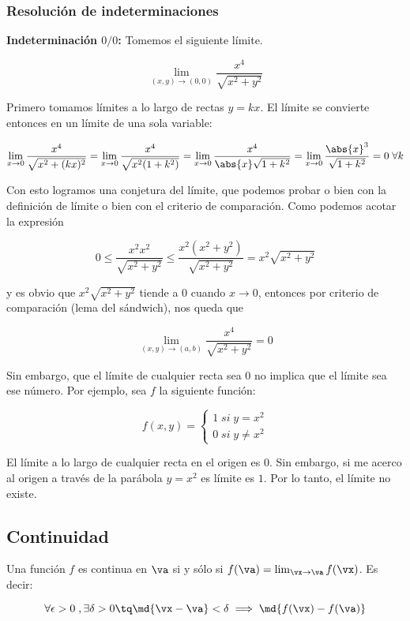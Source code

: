 \documentclass[12pt,a4paper,titlepage]{apuntes}
\begin{document}
\subsubsection{Resolución de indeterminaciones}

\textbf{Indeterminación $0/0$:} Tomemos el siguiente límite.

\[ \lim_{(x,y)\to(0,0)} \frac{x^4}{\sqrt{x^2+y^2}} \]

Primero tomamos límites a lo largo de rectas $y=kx$. El límite se convierte entonces en un límite de una sola variable:

\[\lim_{x\to 0} \frac{x^4}{\sqrt{x^2+(kx)^2}} = \lim_{x\to 0} \frac{x^4}{\sqrt{x^2(1+k^2)}} = \lim_{x\to 0} \frac{x^4}{\abs{x}\sqrt{1+k^2}} = \lim_{x\to 0} \frac{\abs{x}^3}{\sqrt{1+k^2}} = 0\; \forall k\]

Con esto logramos una conjetura del límite, que podemos probar o bien con la definición de límite o bien con el criterio de comparación. Como podemos acotar la expresión

\[ 0 \leq \frac{x^2x^2}{\sqrt{x^2+y^2}} \leq \frac{x^2(x^2+y^2)}{\sqrt{x^2+y^2}} = x^2\sqrt{x^2+y^2} \]

y es obvio que $x^2\sqrt{x^2+y^2}$ tiende a $0$ cuando $x\to 0$, entonces por criterio de comparación (lema del sándwich), nos queda que

\[\lim_{(x,y)\to(a,b)}\frac{x^4}{\sqrt{x^2+y^2}} = 0 \]

Sin embargo, que el límite de cualquier recta sea 0 no implica que el límite sea ese número. Por ejemplo, sea $f$ la siguiente función:

\[ f (x,y) = \left\lbrace \begin{matrix} 1\; si\; y=x^2 \\ 0 \; si \; y\neq x^2  \end{matrix}\right. \]

El límite a lo largo de cualquier recta en el origen es $0$. Sin embargo, si me acerco al origen a través de la parábola $y=x^2$ es límite es $1$. Por lo tanto, el límite no existe.

\subsection{Continuidad}

\begin{defn} Una función $f$ es continua en $\va$ si y sólo si $f(\va) = \lim_{\vx\to\va} f(\vx)$. Es decir:

\[ \forall \epsilon > 0\; , \exists \delta > 0 \tq \md{\vx-\va} < \delta \implies \md{f(\vx)-f(\va)} \]
\end{defn}
\end{document}
